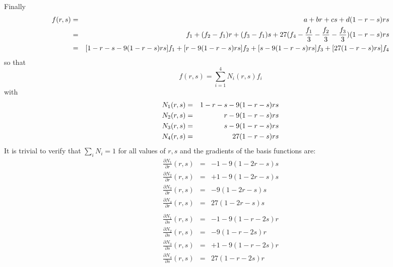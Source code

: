 Finally
\begin{eqnarray}
f(r,s) 
&=&a+br+cs + d (1-r-s)rs \nonumber\\
&=& f_1 + (f_2-f_1)r + (f_3-f_1)s + 27(f_4 - \frac{f_1}{3}  - \frac{f_2}{3}  - \frac{f_3}{3} ) (1-r-s)rs \nonumber\\
&=& [1-r-s-9(1-r-s)rs] f_1 + [r-9(1-r-s)rs ]f_2 + [s-9(1-r-s)rs ]f_3 + [27(1-r-s)rs]f_4 \nonumber
\end{eqnarray}
so that 
\[
f(r,s)=\sum_{i=1}^4 N_i(r,s) f_i
\]
with 
\begin{eqnarray}
N_1(r,s) &=& 1-r-s-9(1-r-s)rs \nonumber\\
N_2(r,s) &=& r-9(1-r-s)rs \nonumber\\
N_3(r,s) &=& s-9(1-r-s)rs \nonumber\\
N_4(r,s) &=& 27(1-r-s)rs \nonumber
\end{eqnarray}
It is trivial to verify that $\sum_i N_i =1$ for all values of $r,s$
and the gradients of the basis functions are:
\begin{eqnarray}
\frac{\partial N_1}{\partial r}(r,s) &=& -1 - 9(1-2r-s)s \\ 
\frac{\partial N_2}{\partial r}(r,s) &=&  +1 - 9(1-2r-s)s \\ 
\frac{\partial N_3}{\partial r}(r,s) &=&  - 9(1-2r-s)s \\ 
\frac{\partial N_4}{\partial r}(r,s) &=&  27(1-2r-s)s \\ 
\\
\frac{\partial N_1}{\partial s}(r,s) &=& -1 - 9(1-r-2s)r \\ 
\frac{\partial N_2}{\partial s}(r,s) &=&    - 9(1-r-2s)r \\ 
\frac{\partial N_3}{\partial s}(r,s) &=& +1 - 9(1-r-2s)r \\ 
\frac{\partial N_4}{\partial s}(r,s) &=&     27(1-r-2s)r 
\end{eqnarray}

